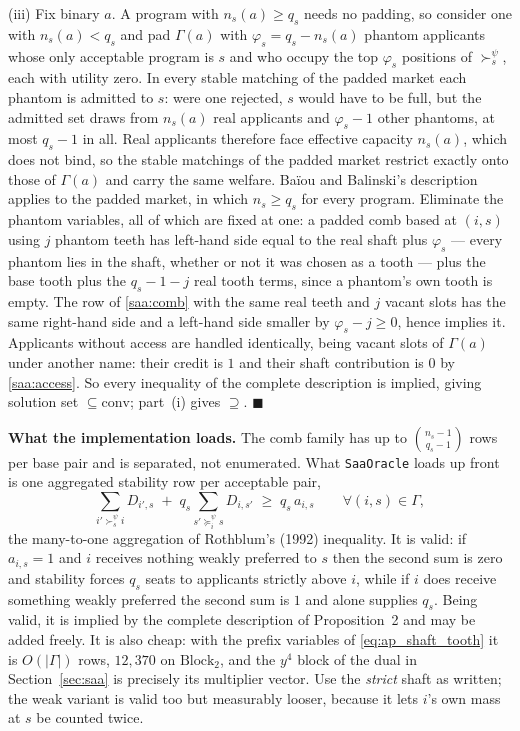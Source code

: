 \documentclass{article}
\begin{document}
(iii) Fix binary $a$. A program with $n_s(a) \ge q_s$ needs no padding, so consider one with $n_s(a) < q_s$ and pad $\Gamma(a)$ with $\varphi_s = q_s - n_s(a)$ phantom applicants whose only acceptable program is $s$ and who occupy the top $\varphi_s$ positions of $\succ_s^\psi$, each with utility zero. In every stable matching of the padded market each phantom is admitted to $s$: were one rejected, $s$ would have to be full, but the admitted set draws from $n_s(a)$ real applicants and $\varphi_s - 1$ other phantoms, at most $q_s - 1$ in all. Real applicants therefore face effective capacity $n_s(a)$, which does not bind, so the stable matchings of the padded market restrict exactly onto those of $\Gamma(a)$ and carry the same welfare. Baïou and Balinski's description applies to the padded market, in which $n_s \ge q_s$ for every program. Eliminate the phantom variables, all of which are fixed at one: a padded comb based at $(i,s)$ using $j$ phantom teeth has left-hand side equal to the real shaft plus $\varphi_s$ --- every phantom lies in the shaft, whether or not it was chosen as a tooth --- plus the base tooth plus the $q_s - 1 - j$ real tooth terms, since a phantom's own tooth is empty. The row of \eqref{saa:comb} with the same real teeth and $j$ vacant slots has the same right-hand side and a left-hand side smaller by $\varphi_s - j \ge 0$, hence implies it. Applicants without access are handled identically, being vacant slots of $\Gamma(a)$ under another name: their credit is $1$ and their shaft contribution is $0$ by \eqref{saa:access}. So every inequality of the complete description is implied, giving solution set $\subseteq \mathrm{conv}$; part~(i) gives $\supseteq$. $\blacksquare$


\noindent\textbf{What the implementation loads.}
The comb family has up to $\binom{n_s - 1}{q_s - 1}$ rows per base pair and is separated, not enumerated. What \texttt{SaaOracle} loads up front is one aggregated stability row per acceptable pair,
\begin{equation}\label{saa:rothblum}
\sum_{i' \succ_s^\psi i} D_{i',s} \;+\; q_s \sum_{s' \succeq_i^\psi s} D_{i,s'} \;\ge\; q_s\, a_{i,s}
\qquad \forall (i,s) \in \Gamma ,
\end{equation}
the many-to-one aggregation of Rothblum's (1992) inequality. It is valid: if $a_{i,s} = 1$ and $i$ receives nothing weakly preferred to $s$ then the second sum is zero and stability forces $q_s$ seats to applicants strictly above $i$, while if $i$ does receive something weakly preferred the second sum is $1$ and alone supplies $q_s$. Being valid, it is implied by the complete description of Proposition~2 and may be added freely. It is also cheap: with the prefix variables of \eqref{eq:ap_shaft_tooth} it is $O(|\Gamma|)$ rows, $12{,}370$ on $\text{Block}_2$, and the $y^{4}$ block of the dual in Section~\ref{sec:saa} is precisely its multiplier vector. Use the \emph{strict} shaft as written; the weak variant is valid too but measurably looser, because it lets $i$'s own mass at $s$ be counted twice.
\end{document}
